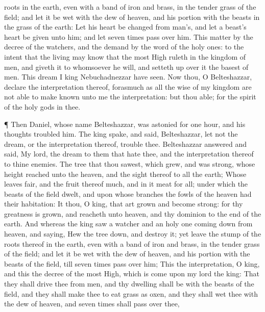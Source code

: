 {roots in the
earth, even with a
band of
iron and
brass, in the tender
grass of the
field; and let it be
wet with the
dew of
heaven, and
{} his
portion
{}
with the
beasts in the
grass of the
earth:
Let his
heart be
changed
from
man’s, and let a
beast’s
heart be
given unto him; and let
seven
times
pass
over him.
This
matter
{} by the
decree of the
watchers, and the
demand by the
word of the holy
ones:
to the
intent that the
living may
know that the most
High
ruleth in the
kingdom of
men, and
giveth it to
whomsoever he
will, and setteth
up
over it the
basest of
men.
This
dream
I
king
Nebuchadnezzar have
seen. Now
thou, O
Belteshazzar,
declare the
interpretation thereof, forasmuch
as
all the
wise
{} of my
kingdom are
not
able to make
known unto me the
interpretation: but
thou
{}
able; for the
spirit of the
holy
gods
{} in thee.
\par }{\PP {}¶
Then
Daniel, whose
name
{}
Belteshazzar, was
astonied for
one
hour, and his
thoughts
troubled him. The
king
spake, and
said,
Belteshazzar, let
not the
dream, or the
interpretation thereof,
trouble thee.
Belteshazzar
answered and
said, My
lord, the
dream
{} to them that
hate thee, and the
interpretation thereof to thine
enemies.
The
tree that thou
sawest, which
grew, and was
strong, whose
height
reached unto the
heaven, and the
sight thereof to
all the
earth;
Whose
leaves
{}
fair, and the
fruit thereof
much, and in it
{}
meat for
all;
under which the
beasts of the
field
dwelt, and upon whose
branches the
fowls of the
heaven had their
habitation:
It
{}
thou, O
king, that art
grown and become
strong: for thy
greatness is
grown, and
reacheth unto
heaven, and thy
dominion to the
end of the
earth.
And whereas the
king
saw a
watcher and an holy
one coming
down
from
heaven, and
saying,
Hew the
tree
down, and
destroy it;
yet
leave the
stump of the
roots thereof in the
earth, even with a
band of
iron and
brass, in the tender
grass of the
field; and let it be
wet with the
dew of
heaven, and
{} his
portion
{}
with the
beasts of the
field,
till
seven
times
pass
over him;
This
{} the
interpretation, O
king, and
this
{} the
decree of the most
High, which is
come
upon my
lord the
king:
That they shall
drive thee
from
men, and thy
dwelling shall
be
with the
beasts of the
field, and they shall make thee to
eat
grass as
oxen, and they shall
wet thee with the
dew of
heaven, and
seven
times shall
pass
over thee,
}
